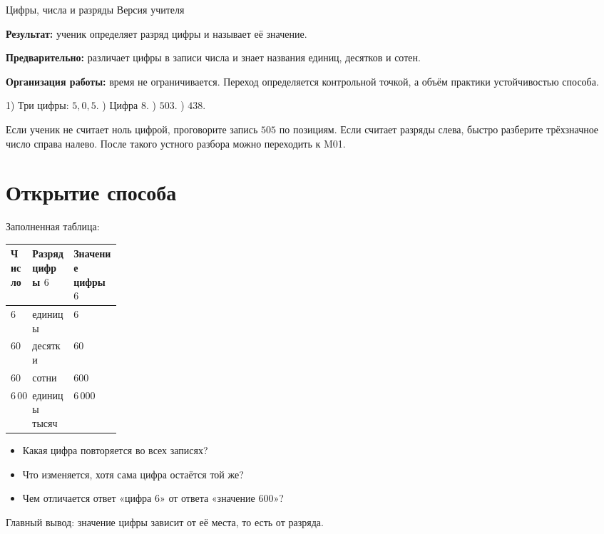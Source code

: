 \worksheettitle
  {Цифры, числа и разряды}
  { Версия учителя}

\begin{teacherbox}
  \textbf{Результат:} ученик определяет разряд цифры и называет её значение.

  \textbf{Предварительно:} различает цифры в записи числа и знает названия
  единиц, десятков и сотен.

  \textbf{Организация работы:} время не ограничивается. Переход определяется
  контрольной точкой, а объём практики \textemdash{} устойчивостью способа.
\end{teacherbox}

\begin{checkpointbox}
  1) Три цифры: \(5,0,5\). ) Цифра \(8\). ) \(503\). ) \(438\).

  Если ученик не считает ноль цифрой, проговорите запись \(505\) по позициям.
  Если считает разряды слева, быстро разберите трёхзначное число справа
  налево. После такого устного разбора можно переходить к M01.
\end{checkpointbox}

\section{Открытие способа}

Заполненная таблица:

\begin{center}
\renewcommand{\arraystretch}{1.38}
\begin{tabularx}{0.9\linewidth}{@{}>{\centering\arraybackslash}p{0.18\linewidth}>{\centering\arraybackslash}X>{\centering\arraybackslash}X@{}}
  \toprule
  \rowcolor{TableHeader}
  Число & Разряд цифры \(6\) & Значение цифры \(6\) \\
  \midrule
  \(6\) & единицы & \(6\) \\
  \(60\) & десятки & \(60\) \\
  \(600\) & сотни & \(600\) \\
  \(6\,000\) & единицы тысяч & \(6\,000\) \\
  \bottomrule
\end{tabularx}
\end{center}

\begin{teacherbox}
  \begin{itemize}
    \item Какая цифра повторяется во всех записях?
    \item Что изменяется, хотя сама цифра остаётся той же?
    \item Чем отличается ответ «цифра 6» от ответа «значение 600»?
  \end{itemize}
  Главный вывод: значение цифры зависит от её места, то есть от разряда.
\end{teacherbox}

